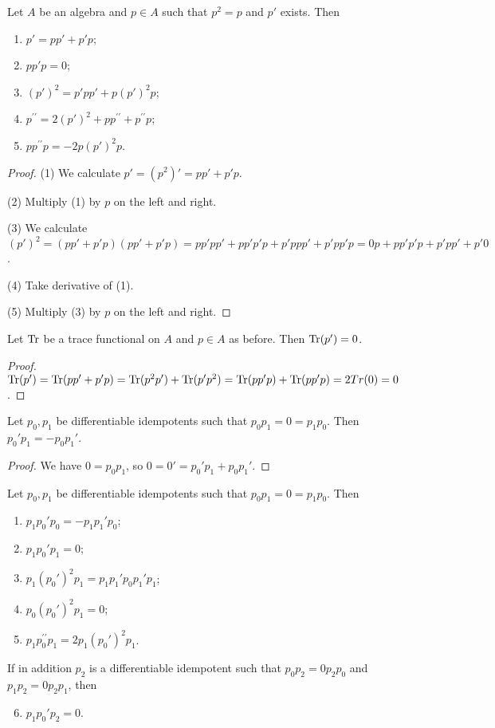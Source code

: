 \begin{proposition} \label{derivativeIdempotent}
Let $A$ be an algebra and $p\in A$ such that $p^2 = p$ and $p'$ exists. Then
\begin{enumerate}
\item $p' = pp'+ p'p$;
\item $pp'p = 0$;
\item $(p')^2 = p'pp' + p(p')^2p$;
\item $p^{\prime\prime} = 2(p')^2 + pp^{\prime\prime} + p^{\prime\prime}p$;
\item $pp^{\prime\prime}p = -2p(p')^2p$.
\end{enumerate}
\end{proposition}
\begin{proof}
(1) We calculate $p' = (p^2)' = pp'+ p'p$.

(2) Multiply (1) by $p$ on the left and right.

(3) We calculate $(p')^2 = (pp'+ p'p)(pp'+ p'p) = pp'pp' + pp'p'p + p'ppp' + p'pp'p = 0p + pp'p'p + p'pp' + p'0$.

(4) Take derivative of (1).

(5) Multiply (3) by $p$ on the left and right.
\end{proof}
\begin{corollary}
Let $\operatorname{Tr}$ be a trace functional on $A$ and $p\in A$ as before. Then $\operatorname{Tr}(p') = 0$.
\end{corollary}
\begin{proof}
$\operatorname{Tr}(p') = \operatorname{Tr}(pp'+ p'p) = \operatorname{Tr}(p^2p')+ \operatorname{Tr}(p'p^2) = \operatorname{Tr}(pp'p) + \operatorname{Tr}(pp'p) = 2Tr(0) = 0$.
\end{proof}
\begin{proposition}
Let $p_0,p_1$ be differentiable idempotents such that $p_0p_1 = 0 = p_1p_0$. Then $p_0'p_1 = -p_0p_1'$.
\end{proposition}
\begin{proof}
We have $0 = p_0p_1$, so $0 = 0' = p_0'p_1 + p_0p_1'$.
\end{proof}
\begin{corollary}
Let $p_0,p_1$ be differentiable idempotents such that $p_0p_1 = 0 = p_1p_0$. Then
\begin{enumerate}
\item $p_1p_0'p_0 = -p_1p_1'p_0$;
\item $p_1p_0'p_1 = 0$;
\item $p_1(p_0')^2p_1 = p_1p_1'p_0p_1'p_1$;
\item $p_0(p_0')^2p_1 = 0$;
\item $p_1p^{\prime\prime}_0p_1 = 2p_1(p_0')^2p_1$.
\end{enumerate}
If in addition $p_2$ is a differentiable idempotent such that $p_0p_2 = 0 p_2p_0$ and $p_1p_2 = 0 p_2p_1$, then
\begin{enumerate} \setcounter{enumi}{5}
\item $p_1p_0'p_2 = 0$.
\end{enumerate}
\end{corollary}
